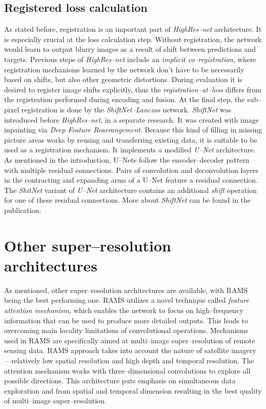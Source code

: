 \subsection{Registered loss calculation}
As stated before, registration is an important part of \textit{HighRes--net} architecture.
It is especially crucial at the loss calculation step.
Without registration, the network would learn to output blurry images as a result of shift between predictions and targets.
Previous steps of \textit{HighRes--net} include an \textit{implicit co--registration}, where registration mechanisms learned by the network don't have to be necessarily based on shifts, but also other geometric distortions.
During evaluation it is desired to register image shifts explicitly, thus the \textit{registration--at--loss} differs from the registration performed during encoding and fusion.
At the final step, the sub--pixel registration is done by the \textit{ShiftNet--Lanczos} network.
\textit{ShiftNet} \cite{zhaoyi-2018-shiftnet} was introduced before \textit{HighRes--net}, in a separate research.
It was created with image inpainting via \textit{Deep Feature Rearrangement}.
Because this kind of filling in missing picture areas works by reusing and transferring existing data, it is suitable to be used as a registration mechanism.
It implements a modified \textit{U--Net} \cite{ronnenberger-2015-unet} architecture.
As mentioned in the introduction, U--Nets follow the encoder--decoder pattern with multiple residual connections.
Pairs of convolution and deconvolution layers in the contracting and expanding arms of a U--Net feature a residual connection.
The \textit{ShitNet} variant of \textit{U--Net} architecture contains an additional \textit{shift} operation for one of these residual connections.
More about \textit{ShiftNet} can be found in the publication.

\section{Other super--resolution architectures}
As mentioned, other super--resolution architectures are available, with RAMS \cite{salvetti-2020-rams} being the best performing one.
RAMS utilizes a novel technique called \textit{feature attention mechanism}, which enables the network to focus on high--frequency information that can be used to produce more detailed outputs.
This leads to overcoming main locality limitations of convolutional operations.
Mechanisms used in RAMS are specifically aimed at multi--image super--resolution of remote sensing data.
RAMS approach takes into account the nature of satellite imagery---relatively low spatial resolution and high depth and temporal resolution.
The attention mechanism works with three--dimensional convolutions to explore all possible directions.
This architecture puts emphasis on simultaneous data exploration and from spatial and temporal dimension resulting in the best quality of multi--image super--resolution.